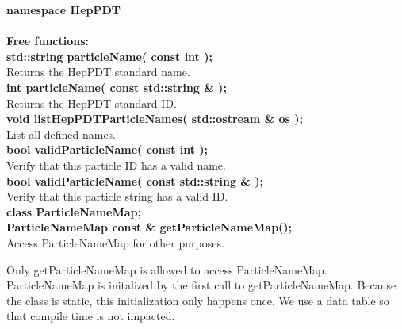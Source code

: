 \begin{tabbing}

{\bf namespace HepPDT} \\  \\

{\bf Free functions:} \\

\hspace{0.5in} {\bf std::string  particleName( const int );} \\
\hspace{1.0in}  Returns the HepPDT standard name. \\

\hspace{0.5in} {\bf int  particleName( const std::string \& );} \\
\hspace{1.0in}  Returns the HepPDT standard ID. \\

\hspace{0.5in} {\bf void  listHepPDTParticleNames( std::ostream \& os );} \\
\hspace{1.0in} List all defined names.  \\

\hspace{0.5in} {\bf bool validParticleName( const int );} \\
\hspace{1.0in} Verify that this particle ID has a valid name.  \\

\hspace{0.5in} {\bf bool validParticleName( const std::string \& );} \\
\hspace{1.0in} Verify that this particle string has a valid ID.  \\

\hspace{0.5in} {\bf class ParticleNameMap;} \\
\hspace{0.5in} {\bf ParticleNameMap const \&  getParticleNameMap();} \\
\hspace{1.0in} Access ParticleNameMap for other purposes.  \\
\end{tabbing}

Only getParticleNameMap is allowed to access ParticleNameMap.
ParticleNameMap is initalized by the first call to getParticleNameMap.
Because the class is static, this initialization only happens once.
We use a data table so that compile time is not impacted.

\vfill\eject
